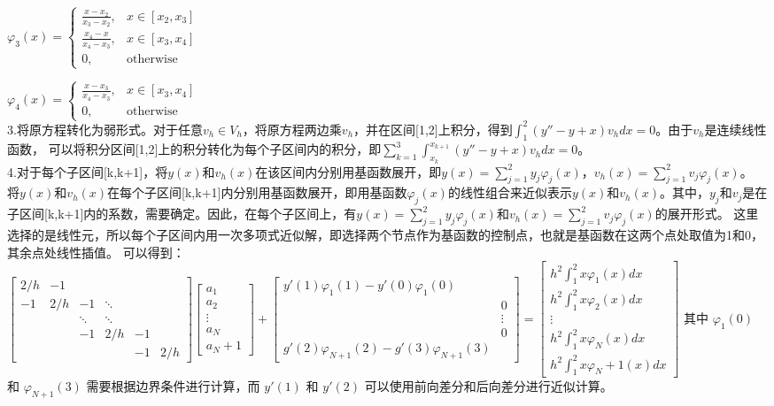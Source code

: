 \documentclass[12pt, a4paper, oneside]{ctexart}
\begin{document}
\begin{spacing}{2.0}
$\varphi_3(x)=\begin{cases}
    \frac{x-x_2}{x_3-x_2}, & x\in[x_2,x_3]\\
    \frac{x_4-x}{x_4-x_3}, & x\in[x_3,x_4]\\
    0, & \text{otherwise}
\end{cases}$

$\varphi_4(x)=\begin{cases}
    \frac{x-x_3}{x_4-x_3}, & x\in[x_3,x_4]\\
    0, & \text{otherwise}
\end{cases}$
\\
3.将原方程转化为弱形式。对于任意$v_h\in V_h$，将原方程两边乘$v_h$，并在区间[1,2]上积分，得到$\int_1^2(y''-y+x)v_hdx=0$。由于$v_h$是连续线性函数，
可以将积分区间[1,2]上的积分转化为每个子区间内的积分，即$\displaystyle\sum_{k=1}^{3}\int_{x_k}^{x_{k+1}}(y''-y+x)v_hdx=0$。
\\
4.对于每个子区间[k,k+1]，将$y(x)$和$v_h(x)$在该区间内分别用基函数展开，即$\displaystyle y(x)=\sum_{j=1}^{2}y_j\varphi_j(x)$，$ \displaystyle v_h(x)=\sum_{j=1}^{2}v_j\varphi_j(x)$。
将$y(x)$和$v_h(x)$在每个子区间[k,k+1]内分别用基函数展开，即用基函数$\varphi_j(x)$的线性组合来近似表示$y(x)$和$v_h(x)$。其中，$y_j$和$v_j$是在
子区间[k,k+1]内的系数，需要确定。因此，在每个子区间上，有$\displaystyle y(x)=\sum_{j=1}^{2}y_j\varphi_j(x)$和$\displaystyle v_h(x)=\sum_{j=1}^{2}v_j\varphi_j(x)$的展开形式。
这里选择的是线性元，所以每个子区间内用一次多项式近似解，即选择两个节点作为基函数的控制点，也就是基函数在这两个点处取值为1和0，其余点处线性插值。
可以得到：
$\begin{bmatrix}2/h&-1\\ -1&2/h&-1&\ddots\\ &&\ddots&\ddots\\ &&-1&2/h&-1\\ &&&&-1&2/h\end{bmatrix}\begin{bmatrix}a_1\\ a_2\\ \vdots\\ a_N\\ a_N+1\end{bmatrix} + 
\begin{bmatrix}y'(1)\varphi_1(1)-y'(0)\varphi_1(0)\\ &0\\ &\vdots\\ &0\\ g'(2)\varphi_{N+1}(2)-g'(3)\varphi_{N+1}(3)\end{bmatrix} = 
\begin{bmatrix}h^2\int_1^2x\varphi_1(x)dx\\ h^2\int_1^2x\varphi_2(x)dx\\ \vdots\\ h^2\int_1^2x\varphi_N(x)dx\\ h^2\int_1^2x\varphi_N+1(x)dx\end{bmatrix}$ 
其中 $\varphi_{1}(0)$ 和 $\varphi_{N+1}(3)$ 需要根据边界条件进行计算，而 $y'(1)$ 和 $y'(2)$ 可以使用前向差分和后向差分进行近似计算。


\end{spacing}
\end{document}
